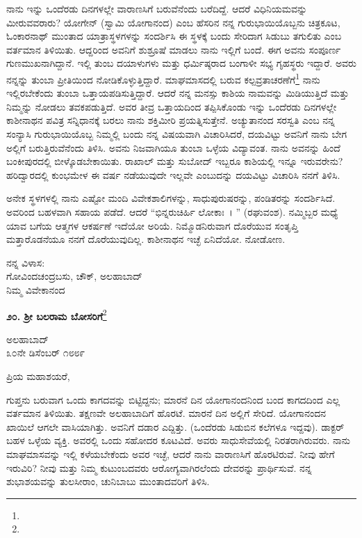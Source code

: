 ನಾನು ಇನ್ನು ಒಂದೆರಡು ದಿನಗಳಲ್ಲೇ ವಾರಾಣಸಿಗೆ ಬರುವೆನೆಂದು ಬರೆದಿದ್ದೆ. ಆದರೆ ವಿಧಿನಿಯಮವನ್ನು ಮೀರುವವರಾರು? ಯೋಗೇನ್ (ಸ್ವಾಮಿ ಯೋಗಾನಂದ) ಎಂಬ ಹೆಸರಿನ ನನ್ನ ಗುರುಭಾಯಿಯೊಬ್ಬನು ಚಿತ್ರಕೂಟ, ಓಂಕಾರನಾಥ್ ಮುಂತಾದ ಯಾತ್ರಾಸ್ಥಳಗಳನ್ನು ಸಂದರ್ಶಿಸಿ ಈ ಸ್ಥಳಕ್ಕೆ ಬಂದು ಸೇರಿದಾಗ ಸಿಡುಬು ತಗುಲಿತು ಎಂಬ ವರ್ತಮಾನ ತಿಳಿಯಿತು. ಆದ್ದರಿಂದ ಅವನಿಗೆ ಶುಶ್ರೂಷೆ ಮಾಡಲು ನಾನು ಇಲ್ಲಿಗೆ ಬಂದೆ. ಈಗ ಅವನು ಸಂಪೂರ್ಣ ಗುಣಮುಖನಾಗಿದ್ದಾನೆ. ಇಲ್ಲಿ ತುಂಬ ದಯಾಳುಗಳು ಮತ್ತು ಧರ್ಮಿಷ್ಠರಾದ ಬಂಗಾಳೀ ಸಭ್ಯ ಗೃಹಸ್ಥರು ಇದ್ದಾರೆ. ಅವರು ನನ್ನನ್ನು ತುಂಬಾ ಪ್ರೀತಿಯಿಂದ ನೋಡಿಕೊಳ್ಳುತ್ತಿದ್ದಾರೆ. ಮಾಘಮಾಸದಲ್ಲಿ ಬರುವ ಕಲ್ಪವ್ರತಾಚರಣೆಗೆ\footnote{} ನಾನು ಇಲ್ಲಿರಬೇಕೆಂದು ತುಂಬಾ ಒತ್ತಾಯಪಡಿಸುತ್ತಿದ್ದಾರೆ. ಆದರೆ ನನ್ನ ಮನಸ್ಸು ಕಾಶಿಯ ನಾಮವನ್ನು ಮಿಡಿಯುತ್ತಿದೆ ಮತ್ತು ನಿಮ್ಮನ್ನು ನೋಡಲು ತವಕಪಡುತ್ತಿದೆ. ಅವರ ತೀವ್ರ ಒತ್ತಾಯದಿಂದ ತಪ್ಪಿಸಿಕೊಂಡು ಇನ್ನು ಒಂದೆರಡು ದಿನಗಳಲ್ಲೇ ಕಾಶೀನಾಥನ ಪವಿತ್ರ ಸನ್ನಿಧಾನಕ್ಕೆ ಬರಲು ನಾನು ಶಕ್ತಿಮೀರಿ ಪ್ರಯತ್ನಿಸುತ್ತೇನೆ. ಅಚ್ಯುತಾನಂದ ಸರಸ್ವತಿ ಎಂಬ ನನ್ನ ಸಂನ್ಯಾಸಿ ಗುರುಭಾಯಿಯೊಬ್ಬ ನಿಮ್ಮಲ್ಲಿ ಬಂದು ನನ್ನ ವಿಷಯವಾಗಿ ವಿಚಾರಿಸಿದರೆ, ದಯವಿಟ್ಟು ಅವನಿಗೆ ನಾನು ಬೇಗ ಅಲ್ಲಿಗೆ ಬರುತ್ತಿರುವೆನೆಂದು ತಿಳಿಸಿ. ಅವನು ನಿಜವಾಗಿಯೂ ತುಂಬಾ ಒಳ್ಳೆಯ ವಿದ್ಯಾವಂತ. ನಾನು ಅವನನ್ನು ಹಿಂದೆ ಬಂಕೀಪುರದಲ್ಲಿ ಬೀಳ್ಕೊಡಬೇಕಾಯಿತು. ರಾಖಾಲ್ ಮತ್ತು ಸುಬೋದ್ ಇಬ್ಬರೂ ಕಾಶಿಯಲ್ಲಿ ಇನ್ನೂ ಇರುವರೇನು?ಹರಿದ್ವಾರದಲ್ಲಿ ಕುಂಭಮೇಳ ಈ ವರ್ಷ ನಡೆಯುವುದೇ ಇಲ್ಲವೇ ಎಂಬುದನ್ನು ದಯವಿಟ್ಟು ವಿಚಾರಿಸಿ ನನಗೆ ತಿಳಿಸಿ.

ಅನೇಕ ಸ್ಥಳಗಳಲ್ಲಿ ನಾನು ಎಷ್ಟೋ ಮಂದಿ ವಿವೇಕಶಾಲಿಗಳನ್ನು, ಸಾಧುಪುರುಷರನ್ನು, ಪಂಡಿತರನ್ನು ಸಂದರ್ಶಿಸಿದೆ. ಅವರಿಂದ ಬಹಳವಾಗಿ ಸಹಾಯ ಪಡೆದೆ. ಆದರೆ ``ಭಿನ್ನರುಚಿರ್ಹಿ ಲೋಕಾಃ~। '' (ರಘುವಂಶ). ನಮ್ಮಿಬ್ಬರ ಮಧ್ಯೆ ಯಾವ ಬಗೆಯ ಆತ್ಮಗಳ ಆಕರ್ಷಣೆ ಇದೆಯೋ ಅರಿಯೆ. ನಿಮ್ಮೊಡನಿರುವಾಗ ದೊರೆಯುವ ಸಂತೃಪ್ತಿ ಮತ್ತಾರೊಡನೆಯೂ ನನಗೆ ದೊರೆಯುವುದಿಲ್ಲ. ಕಾಶೀನಾಥನ ಇಚ್ಛೆ ಏನಿದೆಯೋ. ನೋಡೋಣ.

\vspace{-0.3cm}

{\flushright
ನನ್ನ ವಿಳಾಸ:\\ ಗೋವಿಂದಚಂದ್ರಬಸು, ಚೌಕ್, ಅಲಹಾಬಾದ್\\ನಿಮ್ಮ ವಿವೇಕಾನಂದ\par}

\begin{center}
\textbf{೨೦. ಶ‍್ರೀ ಬಲರಾಮ ಬೋಸರಿಗೆ}\footnote{}
\end{center}

\vspace{-0.5cm}

\begin{flushright}
ಅಲಹಾಬಾದ್\\೩೦ನೇ ಡಿಸೆಂಬರ್ ೧೮೮೯
\end{flushright}

\noindent
ಪ್ರಿಯ ಮಹಾಶಯರೆ,

ಗುಪ್ತನು ಬರುವಾಗ ಒಂದು ಕಾಗದವನ್ನು ಬಿಟ್ಟಿದ್ದನು; ಮಾರನೆ ದಿನ ಯೋಗಾನಂದನಿಂದ ಬಂದ ಕಾಗದದಿಂದ ಎಲ್ಲ ವರ್ತಮಾನ ತಿಳಿಯಿತು. ತಕ್ಷಣವೇ ಅಲಹಾಬಾದಿಗೆ ಹೊರಟೆ. ಮಾರನೆ ದಿನ ಅಲ್ಲಿಗೆ ಸೇರಿದೆ. ಯೋಗಾನಂದನ ಖಾಯಿಲೆ ಆಗಲೇ ವಾಸಿಯಾಗಿತ್ತು. ಅವನಿಗೆ ದಡಾರ ಎದ್ದಿತ್ತು. (ಒಂದೆರಡು ಸಿಡುಬಿನ ಕಲೆಗಳೂ ಇದ್ದವು). ಡಾಕ್ಟರ್ ಬಹಳ ಒಳ್ಳೆಯ ವ್ಯಕ್ತಿ. ಅವರಲ್ಲಿ ಒಂದು ಸಹೋದರ ಕೂಟವಿದೆ. ಅವರು ಸಾಧುಸೇವೆಯಲ್ಲಿ ನಿರತರಾಗಿರುವರು. ನಾನು ಮಾಘಮಾಸವನ್ನು ಇಲ್ಲಿ ಕಳೆಯಬೇಕೆಂದು ಅವರ ಇಚ್ಛೆ, ಆದರೆ ನಾನು ವಾರಾಣಸಿಗೆ ಹೊರಟಿರುವೆ. ನೀವು ಹೇಗೆ ಇರುವಿರಿ? ನೀವು ಮತ್ತು ನಿಮ್ಮ ಕುಟುಂಬದವರು ಆರೋಗ್ಯವಾಗಿರಲೆಂದು ದೇವರನ್ನು ಪ್ರಾರ್ಥಿಸುವೆ. ನನ್ನ ಶುಭಾಶಯವನ್ನು ತುಲಸೀರಾಂ, ಚುನಿಬಾಬು ಮುಂತಾದವರಿಗೆ ತಿಳಿಸಿ.

